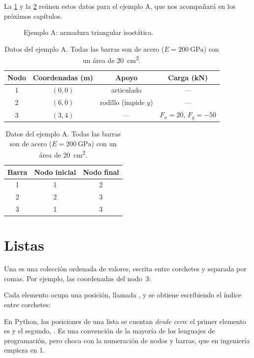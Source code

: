 La \cref{fig:ejemplo_a} y la \cref{tab:ejemplo_a} reúnen estos datos para el
ejemplo A, que nos acompañará en los próximos capítulos.

\begin{figure}[ht]
  \centering
  \caption{Ejemplo A: armadura triangular isostática.}
  \label{fig:ejemplo_a}
\end{figure}

\begin{table}[ht]
  \centering
  \caption{Datos del ejemplo A. Todas las barras son de acero
    ($E = \SI{200}{\giga\pascal}$) con un área de \SI{20}{\centi\metre\squared}.}
  \label{tab:ejemplo_a}
  \begin{tabular}{@{}cccc@{}}
    \toprule
    Nodo & Coordenadas (\si{\metre}) & Apoyo & Carga (\si{\kilo\newton}) \\
    \midrule
    1 & $(0, 0)$ & articulado & --- \\
    2 & $(6, 0)$ & rodillo (impide $y$) & --- \\
    3 & $(3, 4)$ & --- & $F_x = 20$, $F_y = -50$ \\
    \bottomrule
  \end{tabular}
  \par\medskip
  \begin{tabular}{@{}ccc@{}}
    \toprule
    Barra & Nodo inicial & Nodo final \\
    \midrule
    1 & 1 & 2 \\
    2 & 2 & 3 \\
    3 & 1 & 3 \\
    \bottomrule
  \end{tabular}
\end{table}

\section{Listas}\label{sec:listas}

Una  es una colección ordenada de valores, escrita entre
corchetes y separada por comas. Por ejemplo, las coordenadas del nodo~3:

Cada elemento ocupa una posición, llamada , y se
obtiene escribiendo el índice entre corchetes:

\begin{cuidado}
En Python, las posiciones de una lista se cuentan \emph{desde cero}: el primer
elemento es  y el segundo,
. Es una convención de la mayoría de los lenguajes
de programación, pero choca con la numeración de nodos y barras, que en
ingeniería empieza en 1.
\end{cuidado}

